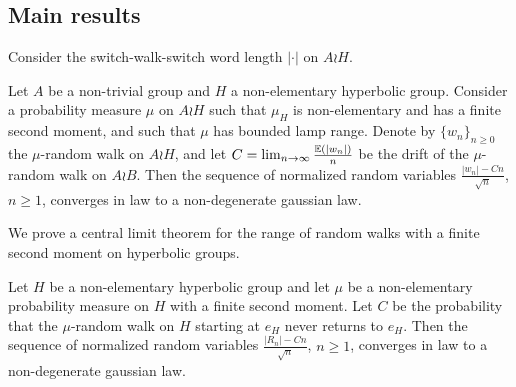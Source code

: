 \subsection{Main results}

Consider the switch-walk-switch word length $|\cdot |$ on $A\wr H$.

\begin{thm}
	Let $A$ be a non-trivial group and $H$ a non-elementary hyperbolic group. Consider a probability measure $\mu$ on $A\wr H$ such that $\mu_H$ is non-elementary and has a finite second moment, and such that $\mu$ has bounded lamp range. Denote by $\{w_n\}_{n\ge 0}$ the $\mu$-random walk on $A\wr H$, and let $C=\lim_{n\to \infty}\frac{\mathbb{E}(|w_n|)}{n}$ be the drift of the $\mu$-random walk on $A\wr B$. Then the sequence of normalized random variables $\frac{|w_n|-Cn}{\sqrt{n}}$, $n\ge 1$, converges in law to a non-degenerate gaussian law.
\end{thm}


We prove a central limit theorem for the range of random walks with a finite second moment on hyperbolic groups.
\begin{thm}\label{thm: CLT range on hyperbolic groups}
	Let $H$ be a non-elementary hyperbolic group and let $\mu$ be a non-elementary probability measure on $H$ with a finite second moment. Let $C$ be the probability that the $\mu$-random walk on $H$ starting at $e_H$ never returns to $e_H$. Then the sequence of normalized random variables $\frac{|R _{n} | - Cn}{\sqrt{n}}$, $n\ge 1$, converges in law to a non-degenerate gaussian law.
\end{thm}
